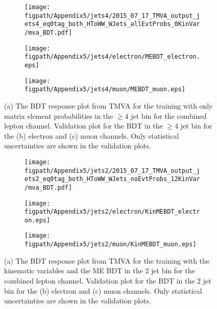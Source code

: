 \begin{figure}[!hbt]
    \centering
    \begin{subfigure}[t]{0.317\textwidth}
        \texttt{[image: \\figpath/Appendix5/jets4/2015\_07\_17\_TMVA\_output\_jets4\_eq0tag\_both\_HToWW\_WJets\_allEvtProbs\_0KinVar/mva\_BDT.pdf]}
        \caption{}
        \label{fig:MEBDT_Response_4j0B_TMVA}
    \end{subfigure}
    \begin{subfigure}[t]{0.317\textwidth}
        \texttt{[image: \\figpath/Appendix5/jets4/electron/MEBDT\_electron.eps]}
        \caption{}
        \label{fig:MEBDT_jets4_electron_noSys}
    \end{subfigure}
    \begin{subfigure}[t]{0.317\textwidth}
        \texttt{[image: \\figpath/Appendix5/jets4/muon/MEBDT\_muon.eps]}
        \caption{}
        \label{fig:MEBDT_jets4_muon_noSys}
    \end{subfigure}
    \caption{(a) The BDT response plot from TMVA for the training with only matrix element probabilities in the $\geqslant$4 jet bin for the combined lepton channel. Validation plot for the BDT in the $\geqslant$4 jet bin for the (b) electron and (c) muon channels. Only statistical uncertainties are shown in the validation plots.}
    \label{fig:MEBDT_Comparison_jets4}
\end{figure}

\begin{figure}[!hbt]
    \centering
    \begin{subfigure}[t]{0.317\textwidth}
        \texttt{[image: \\figpath/Appendix5/jets2/2015\_07\_17\_TMVA\_output\_jets2\_eq0tag\_both\_HToWW\_WJets\_noEvtProbs\_12KinVar/mva\_BDT.pdf]}
        \caption{}
        \label{fig:KinMEBDT_Response_2j0B_TMVA}
    \end{subfigure}
    \begin{subfigure}[t]{0.317\textwidth}
        \texttt{[image: \\figpath/Appendix5/jets2/electron/KinMEBDT\_electron.eps]}
        \caption{}
        \label{fig:KinMEBDT_jets2_electron_noSys}
    \end{subfigure}
    \begin{subfigure}[t]{0.317\textwidth}
        \texttt{[image: \\figpath/Appendix5/jets2/muon/KinMEBDT\_muon.eps]}
        \caption{}
        \label{fig:KinMEBDT_jets2_muon_noSys}
    \end{subfigure}
    \caption{(a) The BDT response plot from TMVA for the training with the kinematic variables and the ME BDT in the 2 jet bin for the combined lepton channel. Validation plot for the BDT in the 2 jet bin for the (b) electron and (c) muon channels. Only statistical uncertainties are shown in the validation plots.}
    \label{fig:KinMEBDT_Comparison_jets2}
\end{figure}

